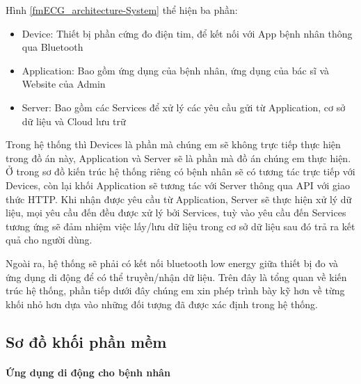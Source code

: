 Hình \ref{fmECG_architecture-System} thể hiện ba phần: 
\begin{itemize}
  \item Device: Thiết bị phần cứng đo điện tim, để kết nối với App bệnh nhân thông qua Bluetooth 
  \item Application: Bao gồm ứng dụng của bệnh nhân, ứng dụng của bác sĩ và Website của Admin
  \item Server: Bao gồm các Services để xử lý các yêu cầu gửi từ Application, cơ sở dữ liệu và Cloud lưu trữ
\end{itemize}

Trong hệ thống thì Devices là phần mà chúng em sẽ không trực tiếp thực hiện trong đồ án này, Application và Server sẽ là
phần mà đồ án chúng em thực hiện. Ở trong sơ đồ kiến trúc hệ thống riêng có bệnh nhân sẽ có tương tác trực tiếp với Devices,
còn lại khối Application sẽ tương tác với Server thông qua API với giao thức HTTP. Khi nhận được yêu cầu từ Application,
Server sẽ thực hiện xử lý dữ liệu, mọi yêu cầu đến đều được xử lý bởi Services, tuỳ vào yêu cầu đến Services tương ứng sẽ đảm nhiệm 
việc lấy/lưu dữ liệu trong cơ sở dữ liệu sau đó trả ra kết quả cho người dùng.

Ngoài ra, hệ thống sẽ phải có kết nối bluetooth low energy giữa thiết bị đo và ứng dụng di động để có thể truyền/nhận dữ liệu.
Trên đây là tổng quan về kiến trúc hệ thống, phần tiếp dưới đây chúng em xin phép trình bày kỹ hơn về từng khối nhỏ hơn
dựa vào những đối tượng đã được xác định trong hệ thống.

\subsection{Sơ đồ khối phần mềm}

\paragraph{Ứng dụng di động cho bệnh nhân}
\mbox{}

